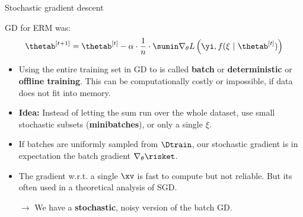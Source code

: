 \begin{vbframe}{Stochastic gradient descent}

GD for ERM was: 
$$
  \thetab^{[t + 1]} = \thetab^{[t]} - \alpha \cdot \frac{1}{n} \cdot \sumin \nabla_\theta L\left(\yi, f(\xi ~|~ \thetab^{[t]})\right)
$$
  \begin{itemize}
    \item Using the entire training set in GD to is called \textbf{batch} or \textbf{deterministic} or \textbf{offline training}. This can be computationally costly or impossible, if data does not fit into memory.
    \item \textbf{Idea:} Instead of letting the sum run over the whole dataset, use small stochastic subsets (\textbf{minibatches}), or only a single $\xi$. 
     \item If batches are uniformly sampled from $\Dtrain$, our stochastic gradient is in expectation the batch gradient $\nabla_\theta \risket$.
    \item The gradient w.r.t. a single $\xv$ is fast to compute but not reliable. But its often used in a theoretical analysis of SGD.
    \item[$\to$] We have a \textbf{stochastic}, noisy version of the batch GD.


  \end{itemize}
 

\end{vbframe}
